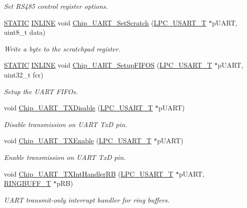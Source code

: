 \begin{DoxyCompactItemize}
\begin{DoxyCompactList}\small\item\em Set R\+S485 control register options. \end{DoxyCompactList}\item 
\hyperlink{group__LPC__Types__Public__Macros_ga10b2d890d871e1489bb02b7e70d9bdfb}{S\+T\+A\+T\+IC} \hyperlink{group__LPC__Types__Public__Types_ga2eb6f9e0395b47b8d5e3eeae4fe0c116}{I\+N\+L\+I\+NE} void \hyperlink{group__UART__17XX__40XX_ga67cb62756a430156bc754a57c72372bd}{Chip\+\_\+\+U\+A\+R\+T\+\_\+\+Set\+Scratch} (\hyperlink{structLPC__USART__T}{L\+P\+C\+\_\+\+U\+S\+A\+R\+T\+\_\+T} $\ast$p\+U\+A\+RT, uint8\+\_\+t data)
\begin{DoxyCompactList}\small\item\em Write a byte to the scratchpad register. \end{DoxyCompactList}\item 
\hyperlink{group__LPC__Types__Public__Macros_ga10b2d890d871e1489bb02b7e70d9bdfb}{S\+T\+A\+T\+IC} \hyperlink{group__LPC__Types__Public__Types_ga2eb6f9e0395b47b8d5e3eeae4fe0c116}{I\+N\+L\+I\+NE} void \hyperlink{group__UART__17XX__40XX_gac1a9d00d4f324e319e1486138b097874}{Chip\+\_\+\+U\+A\+R\+T\+\_\+\+Setup\+F\+I\+F\+OS} (\hyperlink{structLPC__USART__T}{L\+P\+C\+\_\+\+U\+S\+A\+R\+T\+\_\+T} $\ast$p\+U\+A\+RT, uint32\+\_\+t fcr)
\begin{DoxyCompactList}\small\item\em Setup the U\+A\+RT F\+I\+F\+Os. \end{DoxyCompactList}\item 
void \hyperlink{group__UART__17XX__40XX_ga96589453d52bc5e208ffbeced9a49dab}{Chip\+\_\+\+U\+A\+R\+T\+\_\+\+T\+X\+Disable} (\hyperlink{structLPC__USART__T}{L\+P\+C\+\_\+\+U\+S\+A\+R\+T\+\_\+T} $\ast$p\+U\+A\+RT)
\begin{DoxyCompactList}\small\item\em Disable transmission on U\+A\+RT TxD pin. \end{DoxyCompactList}\item 
void \hyperlink{group__UART__17XX__40XX_gafe3fef953086848a51b8ec148c9fff2a}{Chip\+\_\+\+U\+A\+R\+T\+\_\+\+T\+X\+Enable} (\hyperlink{structLPC__USART__T}{L\+P\+C\+\_\+\+U\+S\+A\+R\+T\+\_\+T} $\ast$p\+U\+A\+RT)
\begin{DoxyCompactList}\small\item\em Enable transmission on U\+A\+RT TxD pin. \end{DoxyCompactList}\item 
void \hyperlink{group__UART__17XX__40XX_ga74df5e39960a1535118fcfe2fbe90d30}{Chip\+\_\+\+U\+A\+R\+T\+\_\+\+T\+X\+Int\+Handler\+RB} (\hyperlink{structLPC__USART__T}{L\+P\+C\+\_\+\+U\+S\+A\+R\+T\+\_\+T} $\ast$p\+U\+A\+RT, \hyperlink{structRINGBUFF__T}{R\+I\+N\+G\+B\+U\+F\+F\+\_\+T} $\ast$p\+RB)
\begin{DoxyCompactList}\small\item\em U\+A\+RT transmit-\/only interrupt handler for ring buffers. \end{DoxyCompactList}\end{DoxyCompactItemize}


